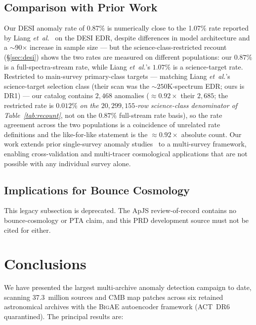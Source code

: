 \documentclass[aps,prd,twocolumn,superscriptaddress,showpacs,preprintnumbers,nofootinbib,longbibliography,floatfix]{revtex4-2}
\newcommand{\etal}{\textit{et~al.}}
\newcommand{\BigAE}{\textsc{BigAE}}
\begin{document}
\subsection{Comparison with Prior Work}\label{sec:comparison}

Our DESI anomaly rate of 0.87\% is numerically close to the 1.07\% rate reported by Liang \etal~\cite{Liang2023} on the DESI EDR, despite differences in model architecture and a $\sim$90$\times$ increase in sample size --- but the science-class-restricted recount (\S\ref{sec:desi}) shows the two rates are measured on different populations: our $0.87\%$ is a full-spectra-stream rate, while Liang \etal's $1.07\%$ is a science-target rate. Restricted to main-survey primary-class targets --- matching Liang \etal's science-target selection class (their scan was the ${\sim}250$K-spectrum EDR; ours is DR1) --- our catalog contains $2{,}468$ anomalies ($\approx\!0.92\times$ their $2{,}685$; the restricted rate is $0.012\%$ \emph{on the $20{,}299{,}155$-row science-class denominator of Table~\ref{tab:recount}}, not on the $0.87\%$ full-stream rate basis), so the rate agreement across the two populations is a coincidence of unrelated rate definitions and the like-for-like statement is the $\approx\!0.92\times$ absolute count. Our work extends prior single-survey anomaly studies~\cite{Baron2017,Liang2023,Nicolaou2026} to a multi-survey framework, enabling cross-validation and multi-tracer cosmological applications that are not possible with any individual survey alone.


\subsection{Implications for Bounce Cosmology}\label{sec:bounce_implications}

This legacy subsection is deprecated. The ApJS review-of-record contains no bounce-cosmology or PTA claim, and this PRD development source must not be cited for either.

\section{Conclusions}\label{sec:conclusions}

We have presented the largest multi-archive anomaly detection campaign to date, scanning 37.3~million sources and CMB map patches across six retained astronomical archives with the \BigAE{} autoencoder framework (ACT~DR6 quarantined). The principal results are:
\end{document}
